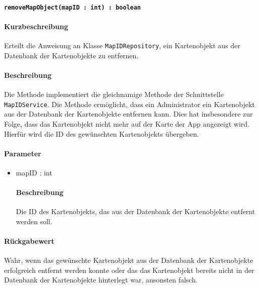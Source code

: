 \paragraph{\texttt{removeMapObject(mapID : int) : boolean}}%
\paragraph*{Kurzbeschreibung}
Erteilt die Anweisung an Klasse \texttt{MapIDRepository}, ein Kartenobjekt aus der Datenbank der Kartenobjekte zu entfernen.
\paragraph*{Beschreibung}
Die Methode implementiert die gleichnamige Methode der Schnittstelle \texttt{MapIDService}.
Die Methode ermöglicht, dass ein Administrator ein Kartenobjekt aus der Datenbank der Kartenobjekte entfernen kann.
Dies hat insbesondere zur Folge, dass das Kartenobjekt nicht mehr auf der Karte der App angezeigt wird.
Hierfür wird die ID des gewünschten Kartenobjekts übergeben.
\paragraph*{Parameter}
\begin{itemize}
    \item mapID : int
    		\paragraph*{Beschreibung}
    		Die ID des Kartenobjekts, das aus der Datenbank der Kartenobjekte entfernt werden soll.
\end{itemize}
\paragraph*{Rückgabewert}
Wahr, wenn das gewünschte Kartenobjekt aus der Datenbank der Kartenobjekte erfolgreich entfernt werden konnte oder das das Kartenobjekt bereits nicht in der Datenbank der Kartenobjekte hinterlegt war, ansonsten falsch.
